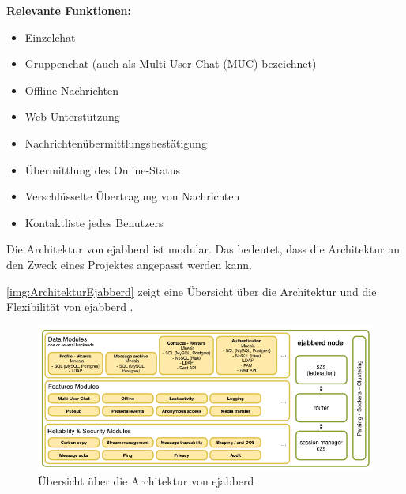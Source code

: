 \documentclass[a4paper,titlepage,halfparskip,12pt]{scrreprt}
\begin{document}
\begin{onehalfspacing}
\bigskip

\textbf{Relevante Funktionen:}

\begin{itemize}
	\item Einzelchat
	\item Gruppenchat (auch als Multi-User-Chat (\ac{MUC}) bezeichnet)
	\item Offline Nachrichten 
	\item Web-Unterstützung
	\item Nachrichtenübermittlungsbestätigung
	\item Übermittlung des Online-Status
	\item Verschlüsselte Übertragung von Nachrichten
	\item Kontaktliste jedes Benutzers
\end{itemize}

Die Architektur von ejabberd ist modular. Das bedeutet, dass die Architektur an den Zweck eines Projektes angepasst werden kann.

\autoref{img:ArchitekturEjabberd} zeigt eine Übersicht über die Architektur und die Flexibilität von ejabberd \cite{ejabberdModulesDeployment}.

\begin{figure}[h]
	\centering
	\includegraphics[width=\linewidth]{images/ejabberd_internals}
	\caption{Übersicht über die Architektur von ejabberd \cite{ejabberdModulesDeployment}}
	\label{img:ArchitekturEjabberd}
\end{figure}


\end{onehalfspacing}
\end{document}
